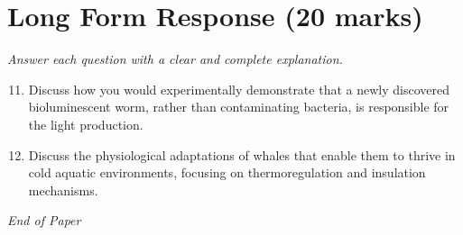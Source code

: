 \documentclass[12pt]{article}
\begin{document}
\section*{Long Form Response (20 marks)}
\textit{Answer each question with a clear and complete explanation.}
\begin{enumerate}[label=\arabic*.]
\setcounter{enumi}{10}
\item Discuss how you would experimentally demonstrate that a newly discovered bioluminescent worm, rather than contaminating bacteria, is responsible for the light production.
\item Discuss the physiological adaptations of whales that enable them to thrive in cold aquatic environments, focusing on thermoregulation and insulation mechanisms.
\end{enumerate}

\vfill
\noindent\textit{End of Paper}
\end{document}
